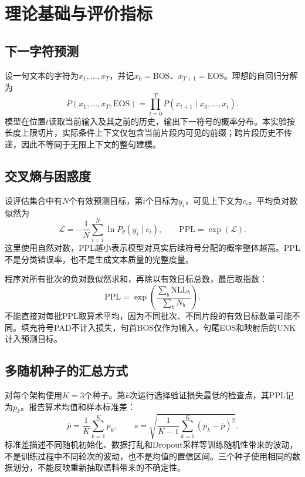 ﻿\documentclass[UTF8,a4paper,12pt]{ctexart}
\begin{document}
\section{理论基础与评价指标}
\subsection{下一字符预测}
设一句文本的字符为$x_1,\ldots,x_T$，并记$x_0=\mathrm{BOS}$、$x_{T+1}=\mathrm{EOS}$。理想的自回归分解为
\begin{equation}
 P(x_1,\ldots,x_T,\mathrm{EOS})
 =\prod_{t=0}^{T}P(x_{t+1}\mid x_0,\ldots,x_t).
\end{equation}
模型在位置$t$读取当前输入及其之前的历史，输出下一符号的概率分布。本实验按长度上限切片，实际条件上下文仅包含当前片段内可见的前缀；跨片段历史不传递，因此不等同于无限上下文的整句建模。

\subsection{交叉熵与困惑度}
设评估集合中有$N$个有效预测目标，第$i$个目标为$y_i$，可见上下文为$c_i$。平均负对数似然为
\begin{equation}
 \mathcal{L}=-\frac{1}{N}\sum_{i=1}^{N}\ln P_\theta(y_i\mid c_i),
 \qquad \mathrm{PPL}=\exp(\mathcal{L}).
\end{equation}
这里使用自然对数，PPL越小表示模型对真实后续符号分配的概率整体越高。PPL不是分类错误率，也不是生成文本质量的完整度量。

程序对所有批次的负对数似然求和，再除以有效目标总数，最后取指数：
\begin{equation}
 \mathrm{PPL}=\exp\!\left(\frac{\sum_b\mathrm{NLL}_b}{\sum_b N_b}\right).
\end{equation}
不能直接对每批PPL取算术平均，因为不同批次、不同片段的有效目标数量可能不同。填充符号PAD不计入损失，句首BOS仅作为输入，句尾EOS和映射后的UNK计入预测目标。

\subsection{多随机种子的汇总方式}
对每个架构使用$K=3$个种子。第$k$次运行选择验证损失最低的检查点，其PPL记为$p_k$。报告算术均值和样本标准差：
\begin{equation}
 \bar p=\frac{1}{K}\sum_{k=1}^{K}p_k,
 \qquad s=\sqrt{\frac{1}{K-1}\sum_{k=1}^{K}(p_k-\bar p)^2}.
\end{equation}
标准差描述不同随机初始化、数据打乱和Dropout采样等训练随机性带来的波动，不是训练过程中不同轮次的波动，也不是均值的置信区间。三个种子使用相同的数据划分，不能反映重新抽取语料带来的不确定性。
\end{document}
